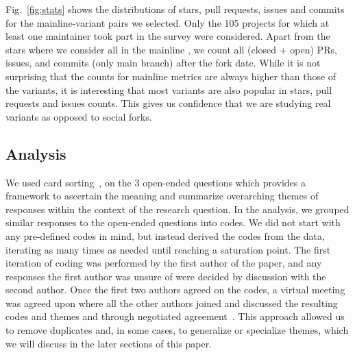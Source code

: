 Fig.~\ref{fig:stats} shows the distributions of stars, pull requests, issues and commits for the mainline-variant pairs we selected. Only the 105 projects for which at least one maintainer took part in the survey were considered.
Apart from the stars where we consider all in the mainline
, we count all (closed + open) PRs, issues, and commits (only main branch) after the fork date. While it is not surprising that the counts for mainline metrics are always higher than those of the variants, it is interesting that most variants are also popular in stars, pull requests and issues counts. This gives us confidence that we are studying real variants as opposed to social forks.


\subsection{Analysis}
\label{sec:card_sorting}


We used card sorting~\cite{zimmermann2016card}, on the 3 open-ended questions which provides a framework to ascertain the meaning and summarize overarching themes of responses within the context of the research question. In the analysis, we grouped similar responses to the open-ended questions into codes. We did not start with any pre-defined codes in mind, but instead derived the codes from the data, iterating as many times as needed until reaching a saturation point. The first iteration of coding was performed by the first author of the paper, and any responses the first author was unsure of were decided by discussion with the second author. Once the first two authors agreed on the codes, a virtual meeting was agreed upon where all the other authors joined and discussed the resulting codes and themes and through negotiated agreement~\cite{Garrison:2006}. This approach allowed us to remove duplicates and, in some cases, to generalize or specialize themes, which we will discuss in the later sections of this paper.
